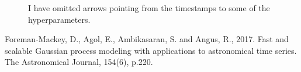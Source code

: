 \documentclass[a4paper, 12pt]{article}
\begin{document}
\begin{figure}[!ht]
\centering

\caption{I have omitted arrows
pointing from the timestamps
to some of the hyperparameters.\label{fig:pgm}}
\end{figure}

\begin{thebibliography}{999}
Foreman-Mackey, D., Agol, E., Ambikasaran, S. and Angus, R., 2017. Fast and scalable Gaussian process modeling with applications to astronomical time series. The Astronomical Journal, 154(6), p.220.
\end{thebibliography}
\end{document}
